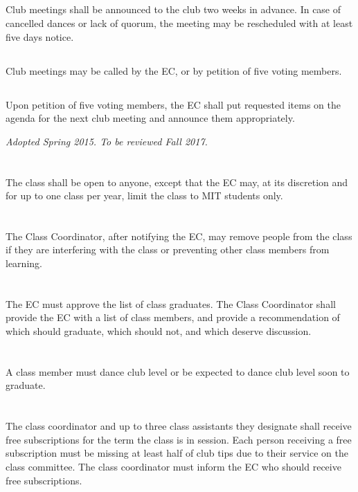\documentclass{bylaws}
\newcommand{\sptimes}[2]{\emph{Adopted #1. To be reviewed #2.}}
\begin{document}
\subsection{}Club meetings shall be announced to the club two weeks in advance. In case of cancelled dances or lack of quorum, the meeting may be rescheduled with at least five days notice.
\subsection{}Club meetings may be called by the EC, or by petition of five voting members.
\subsection{}Upon petition of five voting members, the EC shall put requested items on the agenda for the next club meeting and announce them appropriately.


\sptimes{Spring 2015}{Fall 2017}
\section{}The class shall be open to anyone, except that the EC may, at its discretion and for up to one class per year, limit the class to MIT students only.
\section{}The Class Coordinator, after notifying the EC, may remove people from the class if they are interfering with the class or preventing other class members from learning.
\section{}The EC must approve the list of class graduates. The Class Coordinator shall provide the EC with a list of class members, and provide a recommendation of which should graduate, which should not, and which deserve discussion.
\section{}A class member must dance club level or be expected to dance club level soon to graduate.
\section{}The class coordinator and up to three class assistants they designate shall receive free subscriptions for the term the class is in session. Each person receiving a free subscription must be missing at least half of club tips due to their service on the class committee. The class coordinator must inform the EC who should receive free subscriptions.
\end{document}
